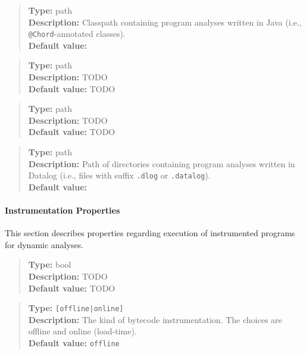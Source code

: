 \noindent {}
\begin{quote}
{\bf Type:} path \\
{\bf Description:} Classpath containing program analyses written in Java (i.e., {\tt @Chord}-annotated classes).  \\
{\bf Default value:} 
\end{quote}

\noindent {}
\begin{quote}
{\bf Type:} path \\
{\bf Description:} TODO \\
{\bf Default value:} TODO
\end{quote}

\noindent {}
\begin{quote}
{\bf Type:} path \\
{\bf Description:} TODO \\
{\bf Default value:} TODO
\end{quote}

\noindent {}
\begin{quote}
{\bf Type:} path  \\
{\bf Description:} Path of directories containing program analyses written in Datalog (i.e., files with suffix {\tt .dlog} or {\tt .datalog}). \\
{\bf Default value:} 
\end{quote}

\paragraph{Instrumentation Properties}

This section describes properties regarding execution of instrumented programs for dynamic analyses.

\noindent {}
\begin{quote}
{\bf Type:} bool \\
{\bf Description:} TODO \\
{\bf Default value:} TODO
\end{quote}

\noindent {}
\begin{quote}
{\bf Type:} {\tt [offline|online]}  \\
{\bf Description:} The kind of bytecode instrumentation.  The choices are offline and online (load-time).  \\
{\bf Default value:} {\tt offline}
\end{quote}

